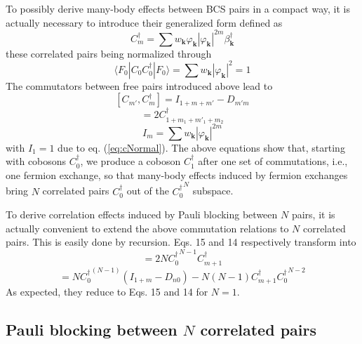 \documentclass[aps,prb,preprint,groupedaddress,amsmath]{revtex4-1}
\newcommand{\vk}{\ensuremath{\mathbf{k}}}
\newcommand{\dg}{\ensuremath{\dagger}}
\begin{document}
To possibly derive many-body effects between BCS pairs in a compact way, it is actually necessary to introduce their generalized form defined as 
\begin{equation}\label{eq:C}
{C}_m^\dg=\sum{w_\vk\varphi_\vk|\varphi_\vk|}^{2m}\beta^\dg_\vk
\end{equation}
these correlated pairs being normalized through
\begin{equation}\label{eq:cNormal}
\langle{}F_0|{C_0}{C_0^\dg}|F_0{\rangle}=\sum{w_\vk}|\varphi_\vk|^{2}=1
\end{equation}
The commutators between free pairs introduced above lead to  
\begin{equation}\label{eq:ID}
[{C}_{m'},C^\dg_m]=I_{1+m+m'}-D_{m'm}
\end{equation}
\begin{equation}
[{D}_{m'_1,m_1},C^\dg_{m_2}]=2C^\dg_{1+m_1+m'_1+m_2}
\end{equation}
\begin{equation}
I_m=\sum{w_\vk|\varphi_\vk|^{2m}}
\end{equation}
with $I_1=1$ due to eq. (\ref{eq:cNormal}). The above equations show that, starting with cobosons $C^\dg_0$, we produce a coboson  $C^\dg_1$ after one set of commutations, i.e., one fermion exchange, so that many-body effects induced by fermion exchanges bring $N$ correlated pairs $C^\dg_0$ out of the  ${C^\dg_0}^N$ subspace.

  To derive correlation effects induced by Pauli blocking between $N$ pairs, it is actually convenient to extend the above commutation relations to $N$ correlated pairs. This is easily done by recursion. Eqs. 15 and 14 respectively transform into
\begin{equation}
[{D}_{m0},C^\dg_{0}{}^N]=2N{C^\dg_{0}}^{N-1}C^\dg_{m+1}
\end{equation}
\begin{equation}
[{C}_{m},C^\dg_{0}{}^N]=N{C^\dg_0}^{(N-1)}(I_{1+m}-D_{n0})-N(N-1)C^\dg_{m+1}{C^\dg_{0}}^{N-2}
\end{equation}
As expected, they reduce to Eqs. 15 and 14 for $N=1$.

\subsection{Pauli blocking between $N$ correlated pairs}
\end{document}
